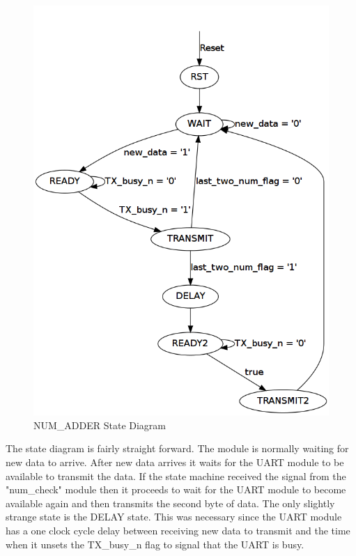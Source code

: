 \documentclass{article}
\begin{document}
	\begin{figure}[h]
		\begin{center}
			\includegraphics[scale=0.25]{../dot/Part-6_state_machine.png}
			\caption{NUM\_ADDER State Diagram}
		\end{center}
	\end{figure}

The state diagram is fairly straight forward. The module is normally waiting for new data to arrive. After new data arrives it waits for the UART module to be available to transmit the data. If the state machine received the signal from the "num\_check" module then it proceeds to wait for the UART module to become available again and then transmits the second byte of data. The only slightly strange state is the DELAY state. This was necessary since the UART module has a one clock cycle delay between receiving new data to transmit and the time when it unsets the TX\_busy\_n flag to signal that the UART is busy. 
\end{document}
